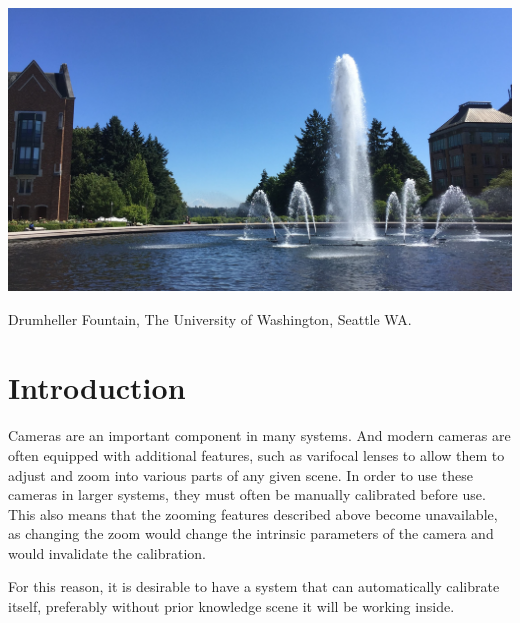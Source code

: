 \documentclass[preprint,acmtog]{acmart}
\begin{document}


\begin{teaserfigure}
  \centering
  \includegraphics[width=6.0in]{fountain}
  \caption{Drumheller Fountain, The University of Washington, Seattle WA.}
\end{teaserfigure}

\maketitle

\section{Introduction}


Cameras are an important component in many systems. And modern cameras are often
equipped with additional features, such as varifocal lenses to allow them to
adjust and zoom into various parts of any given scene. In order to use these
cameras in larger systems, they must often be manually calibrated before
use. This also means that the zooming features described above become
unavailable, as changing the zoom would change the intrinsic parameters of the
camera and would invalidate the calibration.

For this reason, it is desirable to have a system that can automatically
calibrate itself, preferably without prior knowledge scene it will be working
inside.
\end{document}
